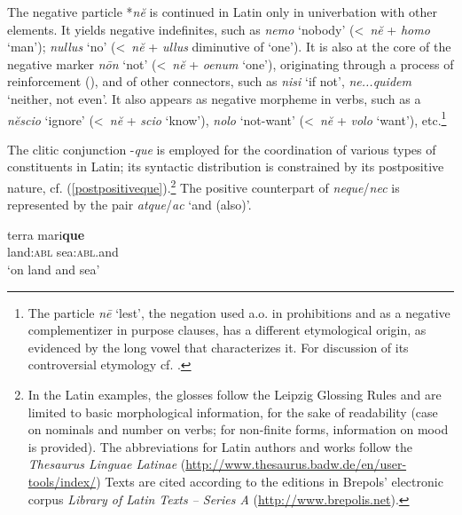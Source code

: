 \documentclass[output=paper]{langsci/langscibook}
\begin{document}
The negative particle *{\emph{n\u{e}}} is continued in Latin only in univerbation with other elements. It yields negative indefinites, such as {\emph{nemo}} `nobody' (\textless \ {\emph{n\u{e}}} + {\emph{homo}} `man'); {\emph{nullus}} `no' (\textless \ {\emph{n\u{e}}} + {\emph{ullus}} diminutive of `one'). It is also at the core of the negative marker {\emph{n\=on}} `not' (\textless \ {\emph{n\u{e}}} + {\emph{oenum}} `one'), originating through a process of reinforcement (\citealt[]{Fruyt08a, Gianollo18}), and of other connectors, such as {\emph{nisi}} `if not', {\emph{ne...quidem}} `neither, not even'. It also appears as negative morpheme in verbs, such as a {\emph{n\u{e}scio}} `ignore' (\textless \ {\emph{n\u{e}}} + {\emph{scio}} `know'), {\emph{nolo}} `not-want' (\textless \ {\emph{n\u{e}}} + {\emph{volo}} `want'), etc.{\footnote{The particle {\emph{n\=e}} `lest', the negation used a.o. in prohibitions and as a negative complementizer in purpose clauses, has a different etymological origin, as evidenced by the long vowel that characterizes it. For discussion of its controversial etymology cf. \citet{deVaan}.}}

The clitic conjunction -{\emph{que}} is employed for the coordination of various types of constituents in Latin; its syntactic distribution is constrained by its postpositive nature, cf. (\ref{postpositiveque}).{\footnote{In the Latin examples, the glosses follow the Leipzig Glossing Rules and are limited to basic morphological information, for the sake of readability (case on nominals and number on verbs; for non-finite forms, information on mood is provided). The abbreviations for Latin authors and works follow the {\emph{Thesaurus Linguae Latinae}} (\url{http://www.thesaurus.badw.de/en/user-tools/index/}) Texts are cited according to the editions in Brepols' electronic corpus {\emph{Library of Latin Texts -- Series A}} (\url{http://www.brepolis.net}).}} The positive counterpart of {\emph{neque}}\slash{\emph{nec}} is represented by the pair {\emph{atque}}/{\emph{ac}} `and (also)'.\largerpage[-1]

{\begin{exe}
\ex \label{postpositiveque} \gll terra mari{\textbf{que}}\\
\linebreak land:{\textsc{abl}} sea:{\textsc{abl}}.and\\
\linebreak \hfill `on land and sea'\\
\end{exe}}
\end{document}
